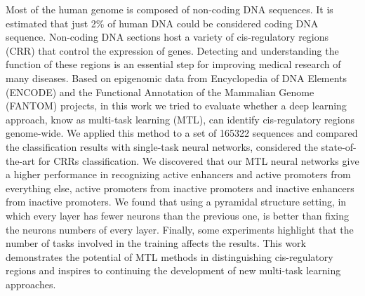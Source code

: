 Most of the human genome is composed of non-coding DNA sequences. It is estimated that just 2\% of human DNA could be considered coding DNA sequence. Non-coding DNA sections host a variety of cis-regulatory regions (CRR) that control the expression of genes. Detecting and understanding the function of these regions is an essential step for improving medical research of many diseases. 
Based on epigenomic data from Encyclopedia of DNA Elements (ENCODE) and the Functional Annotation of the Mammalian Genome (FANTOM) projects, in this work we tried to evaluate whether a deep learning approach, know as multi-task learning (MTL), can identify cis-regulatory regions genome-wide. We applied this method to a set of 165322 sequences and compared the classification results with single-task neural networks, considered the state-of-the-art for CRRs classification.
We discovered that our MTL neural networks give a higher performance in recognizing active enhancers and active promoters from everything else, active promoters from inactive promoters and inactive enhancers from inactive promoters. We found that using a pyramidal structure setting, in which every layer has fewer neurons than the previous one, is better than fixing the neurons numbers of every layer. Finally, some experiments highlight that the number of tasks involved in the training affects the results. 
This work demonstrates the potential of MTL methods in distinguishing cis-regulatory regions and inspires to continuing the development of new multi-task learning approaches. 